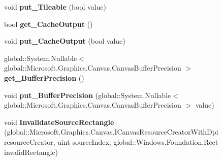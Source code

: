 \begin{DoxyCompactItemize}
\mbox{\label{class_microsoft_1_1_graphics_1_1_canvas_1_1_effects_1_1_turbulence_effect_a8588799f1b33e53343293169f398a24f}} 
void {\bfseries put\+\_\+\+Tileable} (bool value)
\item 
\mbox{\label{class_microsoft_1_1_graphics_1_1_canvas_1_1_effects_1_1_turbulence_effect_a2c596cbdbfb7b80b475624a4c9dce0e8}} 
bool {\bfseries get\+\_\+\+Cache\+Output} ()
\item 
\mbox{\label{class_microsoft_1_1_graphics_1_1_canvas_1_1_effects_1_1_turbulence_effect_a32c398e77df6916280569b73de4cbf02}} 
void {\bfseries put\+\_\+\+Cache\+Output} (bool value)
\item 
\mbox{\label{class_microsoft_1_1_graphics_1_1_canvas_1_1_effects_1_1_turbulence_effect_aa0fb0f26319e287cf2cc4971185f1c90}} 
global\+::\+System.\+Nullable$<$ global\+::\+Microsoft.\+Graphics.\+Canvas.\+Canvas\+Buffer\+Precision $>$ {\bfseries get\+\_\+\+Buffer\+Precision} ()
\item 
\mbox{\label{class_microsoft_1_1_graphics_1_1_canvas_1_1_effects_1_1_turbulence_effect_af5cfe0ab61f3b28ea69b35d8c65fb075}} 
void {\bfseries put\+\_\+\+Buffer\+Precision} (global\+::\+System.\+Nullable$<$ global\+::\+Microsoft.\+Graphics.\+Canvas.\+Canvas\+Buffer\+Precision $>$ value)
\item 
\mbox{\label{class_microsoft_1_1_graphics_1_1_canvas_1_1_effects_1_1_turbulence_effect_a8277a61a5c0e9ccf5bf06b2952d9ad6c}} 
void {\bfseries Invalidate\+Source\+Rectangle} (global\+::\+Microsoft.\+Graphics.\+Canvas.\+I\+Canvas\+Resource\+Creator\+With\+Dpi resource\+Creator, uint source\+Index, global\+::\+Windows.\+Foundation.\+Rect invalid\+Rectangle)
\item 
\mbox{\label{class_microsoft_1_1_graphics_1_1_canvas_1_1_effects_1_1_turbulence_effect_a45a2b70d1f2b56fc298b6088e92aaeff}} 

\end{DoxyCompactItemize}
